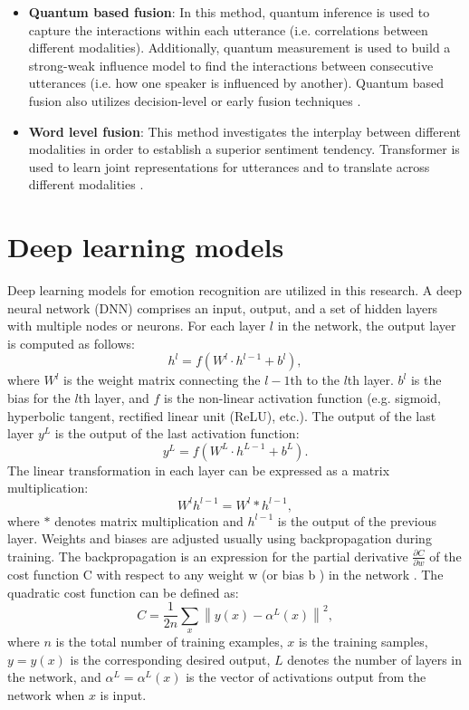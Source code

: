 \begin{itemize}
    \item \textbf{Quantum based fusion}: In this method, quantum inference is used to capture the interactions within each utterance (i.e. correlations between different modalities). Additionally, quantum measurement is used to build a strong-weak influence model to find the interactions between consecutive utterances (i.e. how one speaker is influenced by another). Quantum based fusion also utilizes decision-level or early fusion techniques \cite{MSA-review-3-9686504}. 
    \item \textbf{Word level fusion}: This method investigates the interplay between different modalities in order to establish a superior sentiment tendency. Transformer is used to learn joint representations for utterances and to translate across different modalities \cite{MSA_review2_GANDHI2023424}. 
\end{itemize}

\section{Deep learning models}
Deep learning models for emotion recognition are utilized in this research. A deep neural network (DNN) comprises an input, output, and a set of hidden layers with multiple nodes or neurons. For each layer $l$ in the network, the output layer is computed as follows:
%
\begin{equation*}
    h^{l} = f(W^{l} \cdot h^{l-1} + b^{l}),\tag{1}
\end{equation*}
%
where $W^{l}$ is the weight matrix connecting the $l-1$th to the $l$th layer. $b^{l}$ is the bias for the $l$th layer, and $f$ is the non-linear activation function (e.g. sigmoid, hyperbolic tangent, rectified linear unit (ReLU), etc.). The output of the last layer $y^{L}$ is the output of the last activation function:
%
\begin{equation*}
    y^{L} = f(W^{L} \cdot h^{L-1} + b^{L}). \tag{2}
\end{equation*}
%
The linear transformation in each layer can be expressed as a matrix multiplication:
%
\begin{equation*}
    W^lh^{l-1} = W^l {*} h^{l-1},\tag{3}
\end{equation*}
%
where $*$ denotes matrix multiplication and $h^{l-1}$ is the output of the previous layer. Weights and biases are adjusted usually using backpropagation during training. The backpropagation is an expression for the partial derivative $\frac{\partial C}{\partial w}$ of the cost function C with respect to any weight w (or bias b ) in the network \cite{cross_cultural}. The quadratic cost function can be defined as:
%
    \begin{equation*} C = \frac {1}{2n}\sum _{x}^{} \left \|{ y(x) - \alpha ^{L}(x) }\right \|^{2},\tag{4}\end{equation*}
%
where $n$ is the total number of training examples, $x$ is the training samples, $y=y(x)$ is the corresponding desired output, $L$ denotes the number of layers in the network, and $\alpha ^{L} = \alpha ^{L}(x)$ is the vector of activations output from the network when $x$ is input.

